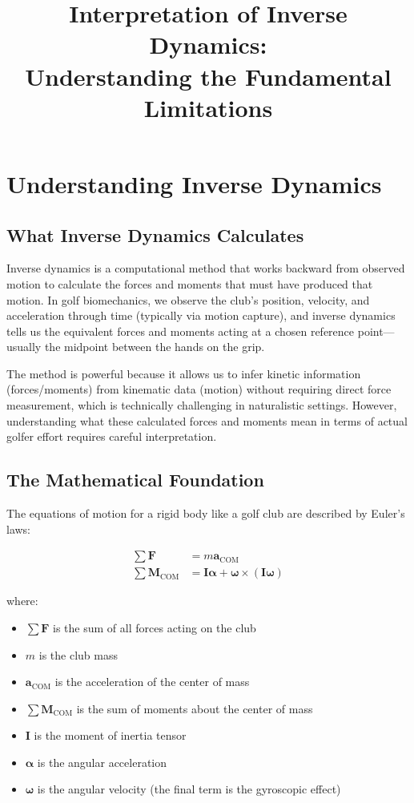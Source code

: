 \documentclass[11pt,a4paper]{article}
\title{\textbf{Interpretation of Inverse Dynamics: \\[0.3em] Understanding the Fundamental Limitations}}
\author{}
\date{}
\newcommand{\bvec}[1]{\mathbf{#1}}
\theoremstyle{definition}
\theoremstyle{plain}
\begin{document}
\maketitle

\section{Understanding Inverse Dynamics}

\subsection{What Inverse Dynamics Calculates}

Inverse dynamics is a computational method that works backward from observed motion to calculate the forces and moments that must have produced that motion. In golf biomechanics, we observe the club's position, velocity, and acceleration through time (typically via motion capture), and inverse dynamics tells us the equivalent forces and moments acting at a chosen reference point—usually the midpoint between the hands on the grip.

The method is powerful because it allows us to infer kinetic information (forces/moments) from kinematic data (motion) without requiring direct force measurement, which is technically challenging in naturalistic settings. However, understanding what these calculated forces and moments mean in terms of actual golfer effort requires careful interpretation.

\subsection{The Mathematical Foundation}

The equations of motion for a rigid body like a golf club are described by Euler's laws:

\begin{align}
\sum \bvec{F} &= m\bvec{a}_{\text{COM}} \label{eq:force_balance}\\
\sum \bvec{M}_{\text{COM}} &= \bvec{I}\bvec{\alpha} + \bvec{\omega} \times (\bvec{I}\bvec{\omega}) \label{eq:moment_balance}
\end{align}

where:
\begin{itemize}
    \item $\sum \bvec{F}$ is the sum of all forces acting on the club
    \item $m$ is the club mass
    \item $\bvec{a}_{\text{COM}}$ is the acceleration of the center of mass
    \item $\sum \bvec{M}_{\text{COM}}$ is the sum of moments about the center of mass
    \item $\bvec{I}$ is the moment of inertia tensor
    \item $\bvec{\alpha}$ is the angular acceleration
    \item $\bvec{\omega}$ is the angular velocity (the final term is the gyroscopic effect)
\end{itemize}
\end{document}
